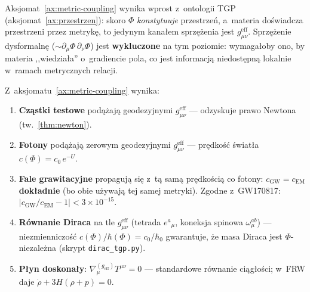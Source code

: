 \begin{remark}
Aksjomat~\ref{ax:metric-coupling} wynika wprost z~ontologii TGP
(aksjomat~\ref{ax:przestrzen}): skoro $\Phi$ \emph{konstytuuje}
przestrze\'n, a~materia do\'swiadcza przestrzeni przez metryk\k{e},
to jedynym kana\l{}em sprz\k{e}\.zenia jest $g_{\mu\nu}^{\mathrm{eff}}$.
Sprz\k{e}\.zenie dysformaln\k{e} ($\sim \partial_\mu\Phi\,\partial_\nu\Phi$)
jest \textbf{wykluczone} na tym poziomie: wymaga\l{}oby ono, by
materia ,,wiedzia\l{}a'' o~gradiencie pola, co jest informacj\k{a}
niedost\k{e}pn\k{a} lokalnie w~ramach metrycznych relacji.
\end{remark}

\begin{proposition}%
\label{prop:coupling-consequences}
Z~aksjomatu~\ref{ax:metric-coupling} wynika:
\begin{enumerate}[nosep]
  \item \textbf{Cz\k{a}stki testowe} pod\k{a}\.zaj\k{a} geodezyjnymi
    $g_{\mu\nu}^{\mathrm{eff}}$ --- odzyskuje prawo Newtona
    (tw.~\ref{thm:newton}).
  \item \textbf{Fotony} pod\k{a}\.zaj\k{a} zerowym geodezyjnymi
    $g_{\mu\nu}^{\mathrm{eff}}$ --- pr\k{e}dko\'s\'c \'swiat\l{}a
    $c(\Phi) = c_0\,e^{-U}$.
  \item \textbf{Fale grawitacyjne} propaguj\k{a} si\k{e} z~t\k{a}
    sam\k{a} pr\k{e}dko\'sci\k{a} co fotony:
    $c_{\mathrm{GW}} = c_{\mathrm{EM}}$ \textbf{dok\l{}adnie}
    (bo obie u\.zywaj\k{a} tej samej metryki).
    Zgodne z~GW170817: $|c_{\mathrm{GW}}/c_{\mathrm{EM}} - 1|
    < 3\times 10^{-15}$.
  \item \textbf{R\'ownanie Diraca} na tle $g_{\mu\nu}^{\mathrm{eff}}$
    (tetrada $e^a{}_\mu$, koneksja spinowa $\omega_\mu^{ab}$)
    --- niezmienniczo\'s\'c $c(\Phi)/\hbar(\Phi) = c_0/\hbar_0$
    gwarantuje, \.ze masa Diraca jest $\Phi$-niezale\.zna
    (skrypt \texttt{dirac\_tgp.py}).
  \item \textbf{P\l{}yn doskona\l{}y}:
    $\nabla_\mu^{(g_{\mathrm{eff}})} T^{\mu\nu} = 0$ ---
    standardowe r\'ownanie ci\k{a}g\l{}o\'sci; w~FRW daje
    $\dot\rho + 3H(\rho + p) = 0$.
\end{enumerate}
\end{proposition}

